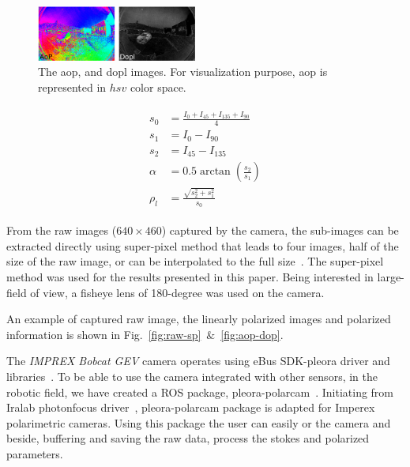 \begin{figure}
  \centering
  \includegraphics[width=0.47\textwidth]{./content/intro/figures/aop-dop.jpg}
  \caption{The \gls{aop}, and \gls{dopl} images. For visualization purpose,
    \gls{aop} is represented in $hsv$ color space.
    \label{fig:stokes-aop-dop}}
\end{figure}


\begin{gather}
  \begin{aligned}
    s_0 & = \frac{I_0 + I_{45} + I_{135} + I_{90}}{4}\\
    s_1 & = I_0 - I_{90} \\
    s_2 & = I_{45} - I_{135} \\
    \alpha &= 0.5 \arctan(\frac{s_2}{s_1}) \\
    \rho_l &= \frac{\sqrt{s_2^{2} + s_1^{2}}}{s_0}
    \label{eq:stokes}
  \end{aligned}
\end{gather}

From the raw images ($640\times460$) captured by the camera, the sub-images can
be extracted directly using super-pixel method that leads to four images, half
of the size of the raw image, or can be interpolated to the full
size~\cite{ratliff2009interpolationmicrogrid,gao2011bilinearpolarimeters}.  The
super-pixel method was used for the results presented in this paper. Being
interested in large-field of view, a fisheye lens of 180-degree was used on the
camera.

An example of captured raw image, the linearly polarized images and polarized
information is shown in Fig.~\ref{fig:raw-sp}~$\&$~\ref{fig:aop-dop}.

The \textit{IMPREX Bobcat GEV} camera operates using eBus SDK-pleora driver and
libraries~\cite{eBus}. To be able to use the camera integrated with other
sensors, in the robotic field, we have created a ROS
package, pleora-polarcam~\cite{pleora_polarcam}.
Initiating from Iralab photonfocus driver~\cite{ira}, pleora-polarcam package
is adapted for Imperex polarimetric cameras.
Using this package the user can easily  or  the
camera and beside, buffering and saving the raw data, process the stokes and
polarized parameters.



